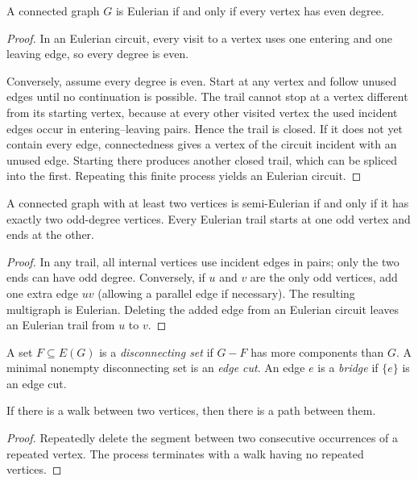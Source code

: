 \begin{notetheorem}
A connected graph $G$ is Eulerian if and only if every vertex has even degree.
\end{notetheorem}
\begin{proof}
In an Eulerian circuit, every visit to a vertex uses one entering and one leaving edge, so every degree is even.

Conversely, assume every degree is even.  Start at any vertex and follow unused edges until no continuation is possible.  The trail cannot stop at a vertex different from its starting vertex, because at every other visited vertex the used incident edges occur in entering--leaving pairs.  Hence the trail is closed.  If it does not yet contain every edge, connectedness gives a vertex of the circuit incident with an unused edge.  Starting there produces another closed trail, which can be spliced into the first.  Repeating this finite process yields an Eulerian circuit.
\end{proof}

\begin{notecorollary}
A connected graph with at least two vertices is semi-Eulerian if and only if it has exactly two odd-degree vertices.  Every Eulerian trail starts at one odd vertex and ends at the other.
\end{notecorollary}
\begin{proof}
In any trail, all internal vertices use incident edges in pairs; only the two ends can have odd degree.  Conversely, if $u$ and $v$ are the only odd vertices, add one extra edge $uv$ (allowing a parallel edge if necessary).  The resulting multigraph is Eulerian.  Deleting the added edge from an Eulerian circuit leaves an Eulerian trail from $u$ to $v$.
\end{proof}

\begin{notedefinition}
A set $F\subseteq E(G)$ is a \emph{disconnecting set} if $G-F$ has more components than $G$.  A minimal nonempty disconnecting set is an \emph{edge cut}.  An edge $e$ is a \emph{bridge} if $\{e\}$ is an edge cut.
\end{notedefinition}

\begin{notelemma}
If there is a walk between two vertices, then there is a path between them.
\end{notelemma}
\begin{proof}
Repeatedly delete the segment between two consecutive occurrences of a repeated vertex.  The process terminates with a walk having no repeated vertices.
\end{proof}

